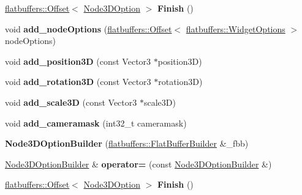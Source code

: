 \begin{DoxyCompactItemize}
\item 
\mbox{\label{structflatbuffers_1_1Node3DOptionBuilder_abfa884c7b365a2512b1145c0af9738d6}} 
\hyperlink{structflatbuffers_1_1Offset}{flatbuffers\+::\+Offset}$<$ \hyperlink{structflatbuffers_1_1Node3DOption}{Node3\+D\+Option} $>$ {\bfseries Finish} ()
\item 
\mbox{\label{structflatbuffers_1_1Node3DOptionBuilder_a23c0907a8e9c0d51ab0f9b9a1d05334e}} 
void {\bfseries add\+\_\+node\+Options} (\hyperlink{structflatbuffers_1_1Offset}{flatbuffers\+::\+Offset}$<$ \hyperlink{structflatbuffers_1_1WidgetOptions}{flatbuffers\+::\+Widget\+Options} $>$ node\+Options)
\item 
\mbox{\label{structflatbuffers_1_1Node3DOptionBuilder_a2cba8c6f3098ef36cab05a9b3998ec2d}} 
void {\bfseries add\+\_\+position3D} (const Vector3 $\ast$position3D)
\item 
\mbox{\label{structflatbuffers_1_1Node3DOptionBuilder_a5884ba5241c12647d2cf7deb1a9ae886}} 
void {\bfseries add\+\_\+rotation3D} (const Vector3 $\ast$rotation3D)
\item 
\mbox{\label{structflatbuffers_1_1Node3DOptionBuilder_afa47d299fe4e74a3b399966f18e325e6}} 
void {\bfseries add\+\_\+scale3D} (const Vector3 $\ast$scale3D)
\item 
\mbox{\label{structflatbuffers_1_1Node3DOptionBuilder_a7ad54cea41dc4839edc2ff3df2dc1eff}} 
void {\bfseries add\+\_\+cameramask} (int32\+\_\+t cameramask)
\item 
\mbox{\label{structflatbuffers_1_1Node3DOptionBuilder_a0a962d7986e7769168ffe2d3ad241dde}} 
{\bfseries Node3\+D\+Option\+Builder} (\hyperlink{classflatbuffers_1_1FlatBufferBuilder}{flatbuffers\+::\+Flat\+Buffer\+Builder} \&\+\_\+fbb)
\item 
\mbox{\label{structflatbuffers_1_1Node3DOptionBuilder_af64efe00efa978ca61fbf716f2b55774}} 
\hyperlink{structflatbuffers_1_1Node3DOptionBuilder}{Node3\+D\+Option\+Builder} \& {\bfseries operator=} (const \hyperlink{structflatbuffers_1_1Node3DOptionBuilder}{Node3\+D\+Option\+Builder} \&)
\item 
\mbox{\label{structflatbuffers_1_1Node3DOptionBuilder_abfa884c7b365a2512b1145c0af9738d6}} 
\hyperlink{structflatbuffers_1_1Offset}{flatbuffers\+::\+Offset}$<$ \hyperlink{structflatbuffers_1_1Node3DOption}{Node3\+D\+Option} $>$ {\bfseries Finish} ()
\end{DoxyCompactItemize}

